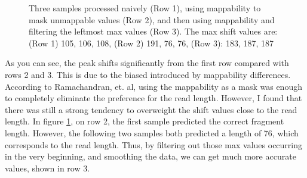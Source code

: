 \documentclass[a4paper]{article}
\begin{document}
\begin{figure}[htp]

      \caption{Three samples processed naively (Row 1), using mappability to mask unmappable values (Row 2), and then using mappability and filtering the leftmost max values (Row 3). The max shift values are: (Row 1) 105, 106, 108, (Row 2) 191, 76, 76, (Row 3): 183, 187, 187}
      \label{fig:1}
    \end{figure}

    As you can see, the peak shifts significantly from the first row compared with rows 2 and 3. This is due to the
    biased introduced by mappability differences.
    According to Ramachandran, et. al, using the mappability as a mask was enough to completely eliminate the preference
    for the read length. However, I found that there was still a strong tendency to overweight the shift values close to
    the read length. In figure \ref{fig:1}, on row 2, the first sample predicted the correct fragment length. However,
    the following two samples both predicted a length of 76, which corresponds to the read length. Thus, by filtering out
    those max values occurring in the very beginning, and smoothing the data, we can get much more accurate values,
    shown in row 3.
\end{document}
